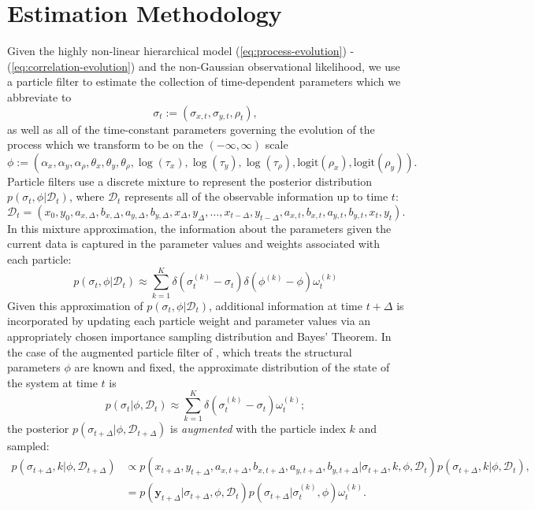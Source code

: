 \documentclass[10pt]{article}
\begin{document}
\section{Estimation Methodology}
Given the highly non-linear hierarchical model
(\ref{eq:process-evolution}) - (\ref{eq:correlation-evolution}) and
the non-Gaussian observational likelihood, we use a particle filter to
estimate the collection of time-dependent parameters which we abbreviate to
\[
  \sigma_t := (\sigma_{x,t}, \sigma_{y,t}, \rho_t),
\]
as well as all of the time-constant parameters governing the evolution
of the process which we transform to be on the $(-\infty, \infty)$ scale
\[
  \phi := (\alpha_x, \alpha_y, \alpha_\rho, \theta_x, \theta_y,
  \theta_\rho, \log(\tau_x), \log(\tau_y), \log(\tau_\rho),
  \mbox{logit}(\rho_x), \mbox{logit}(\rho_y)).
\]
Particle filters use a discrete mixture to represent the posterior
distribution $p(\sigma_t, \phi | \mathcal{D}_t)$, where
$\mathcal{D}_t$ represents all of the observable information up to
time $t$:
\[
  \mathcal{D}_t = (x_0, y_0, a_{x,\Delta}, b_{x,\Delta}, a_{y,\Delta},
  b_{y,\Delta}, x_\Delta, y_\Delta, \ldots, x_{t-\Delta},
  y_{t-\Delta}, a_{x,t}, b_{x,t}, a_{y,t}, b_{y,t}, x_t, y_t).
\]
In this mixture approximation, the information about the parameters
given the current data is captured in the parameter values and weights
associated with each particle:
\[
  p(\sigma_t, \phi | \mathcal{D}_t) \approx \sum_{k=1}^K \delta(\sigma_t^{(k)} - \sigma_t) \delta(\phi^{(k)} - \phi) \omega_t^{(k)}
\]
Given this approximation of $p(\sigma_t, \phi | \mathcal{D}_t)$,
additional information at time $t+\Delta$ is incorporated by updating
each particle weight and parameter values via an appropriately chosen
importance sampling distribution and Bayes' Theorem. In the case of
the augmented particle filter of \cite{pitt1999filtering}, which
treats the structural parameters $\phi$ are known and fixed, the
approximate distribution of the state of the system at time $t$ is
\[
  p(\sigma_t | \phi, \mathcal{D}_t) \approx \sum_{k=1}^K
  \delta(\sigma_t^{(k)} - \sigma_t) \omega_t^{(k)};
\]
the posterior $p(\sigma_{t+\Delta} | \phi, \mathcal{D}_{t+\Delta})$ is
\textit{augmented} with the particle index $k$ and sampled:
\begin{align}
  p(\sigma_{t+\Delta}, k | \phi, \mathcal{D}_{t+\Delta}) &\propto
                                                           p(x_{t+\Delta}, y_{t+\Delta}, a_{x,t+\Delta}, b_{x, t+\Delta},
                                                           a_{y,t+\Delta}, b_{y, t+\Delta} | \sigma_{t+\Delta}, k, \phi,
                                                           \mathcal{D}_t)p(\sigma_{t+\Delta},k | \phi, \mathcal{D}_t), \\
                                                         &= p(\mathbf{y}_{t+\Delta} | \sigma_{t+\Delta}, \phi, \mathcal{D}_t) p(\sigma_{t+\Delta} | \sigma_{t}^{(k)}, \phi) \omega^{(k)}_t. \label{eq:augmented-posterior}
\end{align}
\end{document}
